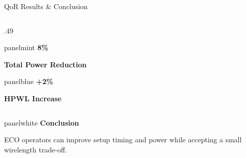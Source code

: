 \documentclass[aspectratio=169,10pt]{beamer}
\begin{document}
\begin{frame}[label=summary-9]{QoR Results \& Conclusion}
\begin{columns}[T,onlytextwidth]
\begin{column}{.49\textwidth}
\begin{beamercolorbox}[rounded=true,sep=.14cm,wd=\linewidth]{panelmint}
        {\fontsize{24}{27}\selectfont\bfseries\color{Accent}8\%}\par\vspace{.025cm}
        {\small\bfseries Total Power Reduction}\par
      \end{beamercolorbox}
      \vspace{.10cm}
      \begin{beamercolorbox}[rounded=true,sep=.14cm,wd=\linewidth]{panelblue}
        {\fontsize{24}{27}\selectfont\bfseries\color{Ink}+2\%}\par\vspace{.025cm}
        {\small\bfseries HPWL Increase}\par
      \end{beamercolorbox}
    \end{column}
  \end{columns}
  \vspace{.09cm}
  \begin{beamercolorbox}[rounded=true,sep=.13cm,wd=\linewidth]{panelwhite}
    {\small\bfseries\color{Accent}Conclusion}\par\vspace{.025cm}
    {\small\color{Ink}ECO operators can improve setup timing and power while accepting a small wirelength trade-off.}
  \end{beamercolorbox}
  \vspace{.06cm}
\end{frame}


\end{document}
